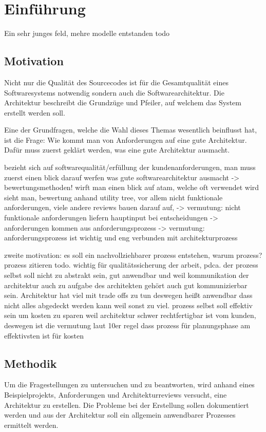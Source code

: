 \chapter{Einführung}
Ein sehr junges feld, mehre modelle entstanden todo

\section{Motivation}
Nicht nur die Qualität des Sourcecodes ist für die Gesamtqualität eines Softwaresystems notwendig sondern auch die Softwarearchitektur. Die Architektur beschreibt die Grundzüge und Pfeiler, auf welchem das System erstellt werden soll.

Eine der Grundfragen, welche die Wahl dieses Themas wesentlich beinflusst hat, ist die Frage: Wie kommt man von Anforderungen auf eine gute Architektur. Dafür muss zuerst geklärt werden, was eine gute Architektur ausmacht.

bezieht sich auf softwarequalität/erfüllung der kundenanforderungen, man muss zuerst einen blick darauf werfen was gute softwarearchitektur ausmacht -> bewertungsmethoden! wirft man einen blick auf atam, welche oft verwendet wird sieht man, bewertung anhand utility tree, vor allem nicht funktionale anforderungen, viele andere reviews bauen darauf auf, -> vermutung: nicht funktionale anforderungen liefern hauptinput bei entscheidungen -> anforderungen kommen aus anforderungsprozess -> vermutung: anforderungsprozess ist wichtig und eng verbunden mit architekturprozess

zweite motivation: es soll ein nachvollziehbarer prozess entstehen, warum prozess? prozess zitieren todo. wichtig für qualitätssicherung der arbeit, pdca. der prozess selbst soll nicht zu abstrakt sein, gut anwendbar und weil kommunikation der architektur auch zu aufgabe des architekten gehört auch gut kommunizierbar sein. Architektur hat viel mit trade offs zu tun deswegen heißt anwendbar dass nicht alles abgedeckt werden kann weil sonst zu viel. prozess selbst soll effektiv sein um kosten zu sparen weil architektur schwer rechtfertigbar ist vom kunden, deswegen ist die vermutung laut 10er regel dass prozess für planungsphase am effektivsten ist für kosten

\section{Methodik}
Um die Fragestellungen zu untersuchen und  zu beantworten, wird anhand eines  Beispielprojekts, Anforderungen und Architekturreviews versucht, eine Architektur zu erstellen. Die Probleme bei der Erstellung sollen dokumentiert werden und aus der Architektur soll ein allgemein anwendbarer Prozesses ermittelt werden.

